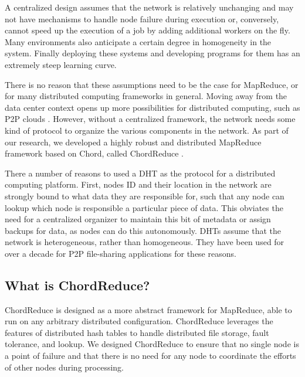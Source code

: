 A centralized design assumes that the network is relatively unchanging and may not have mechanisms to handle node failure during execution or, conversely, cannot speed up the execution of a job by adding additional workers on the fly.
Many environments also anticipate a certain degree in homogeneity in the system.
Finally deploying these systems and developing programs for them has an extremely steep learning curve.

There is no reason that these assumptions need to be the case for MapReduce, or for many distributed computing frameworks in general.
Moving away from the data center context opens up more possibilities for distributed computing, such as P2P clouds \cite{p2p-cloud}.
However, without a centralized framework, the network needs some kind of protocol to organize the various components in the network.
As part of our research, we developed a highly robust and distributed MapReduce framework based on Chord, called ChordReduce \cite{chordreduce}.

There a number of reasons to used a DHT as the protocol for a distributed computing platform.
First, nodes ID and their location in the network are strongly bound to what data they are responsible for, such that any node can lookup which node is responsible a particular piece of data.
This obviates the need for a centralized organizer to maintain this bit of metadata or assign backups for data, as nodes can do this autonomously.
DHTs assume that the network is heterogeneous, rather than homogeneous.
They have been used for over a decade for P2P file-sharing applications for these reasons.




\subsection{What is ChordReduce?}

ChordReduce is designed as a more abstract framework for MapReduce, able to run on any arbitrary distributed configuration.
ChordReduce leverages the features of distributed hash tables to handle distributed file storage, fault tolerance, and lookup.
We designed ChordReduce to ensure that no single node is a point of failure and that there is no need for any node to coordinate the efforts of other nodes during processing.



